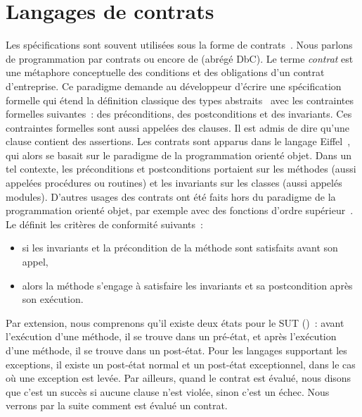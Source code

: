 \section{Langages de contrats}
\label{section:sota:bisl}

Les spécifications sont souvent utilisées sous la forme de {\strong
contrats}~. Nous parlons de programmation par contrats
ou encore de  (abrégé DbC). Le terme {\em contrat}
est une métaphore conceptuelle des conditions et des obligations d'un contrat
d'entreprise. Ce paradigme demande au développeur d'écrire une spécification
formelle qui étend la définition classique des types abstraits~
avec les contraintes formelles suivantes~: des {\strong préconditions}, des
{\strong postconditions} et des {\strong invariants}. Ces contraintes formelles
sont aussi appelées des {\strong clauses}. Il est admis de dire qu'une clause
contient des {\strong assertions}.  Les contrats sont apparus dans le langage
Eiffel~, qui alors se basait sur le paradigme de la
programmation orienté objet. Dans un tel contexte, les préconditions et
postconditions portaient sur les méthodes (aussi appelées procédures ou
routines) et les invariants sur les classes (aussi appelés modules). D'autres
usages des contrats ont été faits hors du paradigme de la programmation orienté
objet, par exemple avec des fonctions d'ordre supérieur~. Le
 définit les critères de conformité suivants~:

\begin{itemize}

\item si les invariants et la précondition de la méthode sont satisfaits avant
son appel,

\item alors la méthode s'engage à satisfaire les invariants et sa postcondition
après son exécution.

\end{itemize}

Par extension, nous comprenons qu'il existe deux états pour le SUT
()~: avant l'exécution d'une méthode, il se trouve
dans un {\strong pré-état}, et après l'exécution d'une méthode, il se trouve
dans un {\strong post-état}. Pour les langages supportant les exceptions, il
existe un post-état normal et un post-état exceptionnel, dans le cas où une
exception est levée. Par ailleurs, quand le contrat est évalué, nous disons que
c'est un {\strong succès} si aucune clause n'est violée, sinon c'est un {\strong
échec}. Nous verrons par la suite comment est évalué un contrat.

